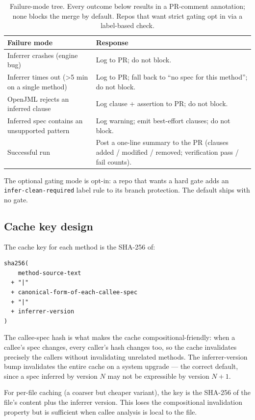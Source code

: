 \begin{table}[ht]
\centering
\caption{Failure-mode tree. Every outcome below results in a PR-comment annotation; none blocks the merge by default. Repos that want strict gating opt in via a label-based check.}
\label{tab:failure-tree}
\small
\begin{tabular}{p{4cm}p{8cm}}
\toprule
\textbf{Failure mode} & \textbf{Response} \\
\midrule
Inferrer crashes (engine bug) & Log to PR; do not block. \\
Inferrer times out (>5 min on a single method) & Log to PR; fall back to ``no spec for this method''; do not block. \\
OpenJML rejects an inferred clause & Log clause + assertion to PR; do not block. \\
Inferred spec contains an unsupported pattern & Log warning; emit best-effort clauses; do not block. \\
Successful run & Post a one-line summary to the PR (clauses added / modified / removed; verification pass / fail counts). \\
\bottomrule
\end{tabular}
\end{table}

The optional gating mode is opt-in: a repo that wants a hard gate adds an \texttt{infer-clean-required} label rule to its branch protection. The default ships with no gate.

\subsection{Cache key design}

The cache key for each method is the SHA-256 of:

\begin{lstlisting}[language={}]
sha256(
    method-source-text
  + "|"
  + canonical-form-of-each-callee-spec
  + "|"
  + inferrer-version
)
\end{lstlisting}

The callee-spec hash is what makes the cache compositional-friendly: when a callee's spec changes, every caller's hash changes too, so the cache invalidates precisely the callers without invalidating unrelated methods. The inferrer-version bump invalidates the entire cache on a system upgrade --- the correct default, since a spec inferred by version $N$ may not be expressible by version $N{+}1$.

For per-file caching (a coarser but cheaper variant), the key is the SHA-256 of the file's content plus the inferrer version. This loses the compositional invalidation property but is sufficient when callee analysis is local to the file.


